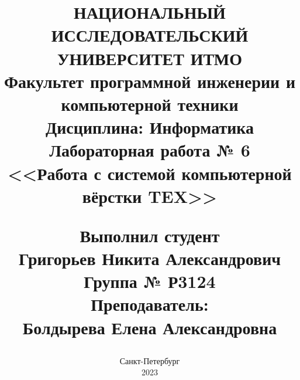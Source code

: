 \begin{titlepage}
	\title{\textbf{НАЦИОНАЛЬНЫЙ ИССЛЕДОВАТЕЛЬСКИЙ УНИВЕРСИТЕТ ИТМО\\
			Факультет программной инженерии и компьютерной техники\\
			\vspace{1cm}
			Дисциплина: Информатика\\
			Лабораторная работа № 6\\
			\large <<Работа с системой компьютерной вёрстки TEX>>}
		\begin{flushright}\fontsize{12}{9}
			\vspace{5cm}
			\textbf{Выполнил студент}\\
			\textup{Григорьев Никита Александрович}\\
			\textup{Группа № Р3124}\\
			\vspace{0.5cm}
			\textbf{Преподаватель:}\\
			\textup{Болдырева Елена Александровна}
			\vspace{5cm}
		\end{flushright}
	}
	\date{Санкт-Петербург\\2023}
	\maketitle
	\thispagestyle{empty}
\end{titlepage}